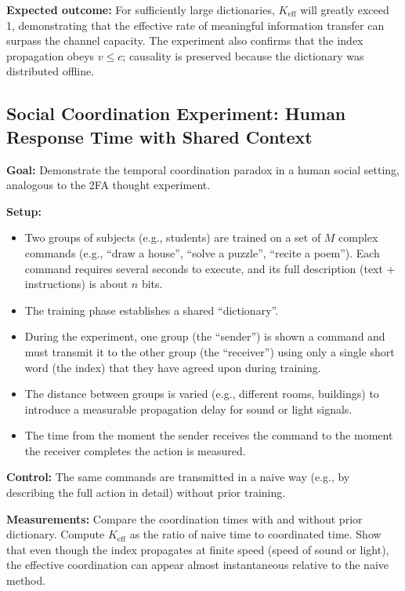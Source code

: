 \documentclass[12pt]{article}
\begin{document}
	\textbf{Expected outcome:} For sufficiently large dictionaries, \(K_{\mathrm{eff}}\) will greatly exceed 1, demonstrating that the effective rate of meaningful information transfer can surpass the channel capacity. The experiment also confirms that the index propagation obeys \(v \le c\); causality is preserved because the dictionary was distributed offline.
	
	\subsection{Social Coordination Experiment: Human Response Time with Shared Context}
	\label{subsec:social-experiment}
	
	\textbf{Goal:} Demonstrate the temporal coordination paradox in a human social setting, analogous to the 2FA thought experiment.
	
	\textbf{Setup:}
	\begin{itemize}
		\item Two groups of subjects (e.g., students) are trained on a set of \(M\) complex commands (e.g., ``draw a house'', ``solve a puzzle'', ``recite a poem''). Each command requires several seconds to execute, and its full description (text + instructions) is about \(n\) bits.
		\item The training phase establishes a shared ``dictionary''.
		\item During the experiment, one group (the ``sender'') is shown a command and must transmit it to the other group (the ``receiver'') using only a single short word (the index) that they have agreed upon during training.
		\item The distance between groups is varied (e.g., different rooms, buildings) to introduce a measurable propagation delay for sound or light signals.
		\item The time from the moment the sender receives the command to the moment the receiver completes the action is measured.
	\end{itemize}
	
	\textbf{Control:} The same commands are transmitted in a naive way (e.g., by describing the full action in detail) without prior training.
	
	\textbf{Measurements:} Compare the coordination times with and without prior dictionary. Compute \(K_{\mathrm{eff}}\) as the ratio of naive time to coordinated time. Show that even though the index propagates at finite speed (speed of sound or light), the effective coordination can appear almost instantaneous relative to the naive method.
	
\end{document}
